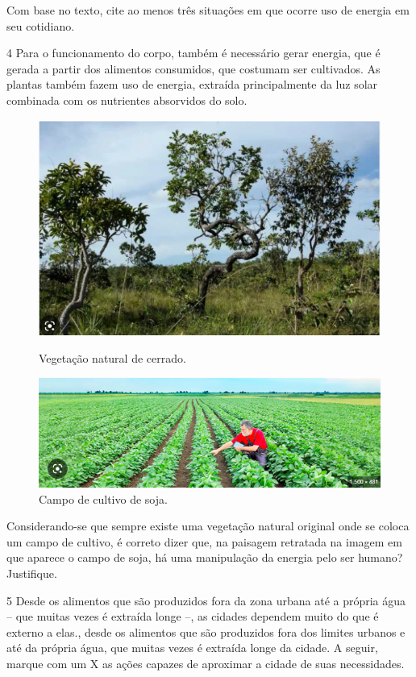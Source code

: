 Com base no texto, cite ao menos três situações em que ocorre uso de energia em seu cotidiano.



\num{4} Para o funcionamento do corpo, também é necessário gerar energia,
que é gerada a partir dos alimentos consumidos, que costumam ser cultivados. As plantas também fazem uso de
energia, extraída principalmente da luz solar combinada com os
nutrientes absorvidos do solo.

\begin{figure}[htpb!]
\includegraphics[width=.5\textwidth]{./imgs/img6.png}
\caption{Vegetação natural de cerrado.}

\includegraphics[width=.5\textwidth]{./imgs/img7.png}
\caption{Campo de cultivo de soja.}
\end{figure}

Considerando-se que sempre existe uma vegetação natural original onde se coloca um campo de cultivo, é correto
dizer que, na paisagem retratada na imagem em que aparece o campo de soja, há uma manipulação da energia pelo ser humano? Justifique.



\num{5} Desde os alimentos que são produzidos fora da zona urbana até a própria água -- que muitas vezes é extraída longe --, as cidades dependem muito do que é externo a elas., desde os alimentos que
são produzidos fora dos limites urbanos e até da própria água, que
muitas vezes é extraída longe da cidade. A seguir, marque com um X as ações capazes
de aproximar a cidade de suas necessidades.

